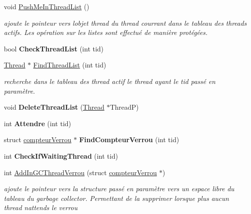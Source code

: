 \begin{DoxyCompactItemize}
void \hyperlink{class_addr_space_a0357219ec2eaccdd49b7635bf06f8172}{Push\+Me\+In\+Thread\+List} ()
\begin{DoxyCompactList}\small\item\em ajoute le pointeur vers l\textquotesingle{}objet thread du thread courrant dans le tableau des threads actifs. Les opération sur les listes sont effectué de manière protégées. \end{DoxyCompactList}\item 
\hypertarget{class_addr_space_a87a8af28618b37bd50316398d5114612}{}\label{class_addr_space_a87a8af28618b37bd50316398d5114612} 
bool {\bfseries Check\+Thread\+List} (int tid)
\item 
\hyperlink{class_thread}{Thread} $\ast$ \hyperlink{class_addr_space_aaaefe0a86296c40a15f6f238bf96f30e}{Find\+Thread\+List} (int tid)
\begin{DoxyCompactList}\small\item\em recherche dans le tableau des thread actif le thread ayant le tid passé en paramètre. \end{DoxyCompactList}\item 
\hypertarget{class_addr_space_a562bc7b549fe84fdc62c90f218bbc528}{}\label{class_addr_space_a562bc7b549fe84fdc62c90f218bbc528} 
void {\bfseries Delete\+Thread\+List} (\hyperlink{class_thread}{Thread} $\ast$ThreadP)
\item 
\hypertarget{class_addr_space_ab20a6e47ab579c7bd195118fdf7d62ca}{}\label{class_addr_space_ab20a6e47ab579c7bd195118fdf7d62ca} 
int {\bfseries Attendre} (int tid)
\item 
\hypertarget{class_addr_space_a1c9adc2f0c3d96a6e646fa9e3fd3ffbf}{}\label{class_addr_space_a1c9adc2f0c3d96a6e646fa9e3fd3ffbf} 
struct \hyperlink{structcompteur_verrou}{compteur\+Verrou} $\ast$ {\bfseries Find\+Compteur\+Verrou} (int tid)
\item 
\hypertarget{class_addr_space_ab3d5374f27f38e8411722dc73d39a22b}{}\label{class_addr_space_ab3d5374f27f38e8411722dc73d39a22b} 
int {\bfseries Check\+If\+Waiting\+Thread} (int tid)
\item 
int \hyperlink{class_addr_space_af63bb5a857c1403fa47b0a55ea989130}{Add\+In\+G\+C\+Thread\+Verrou} (struct \hyperlink{structcompteur_verrou}{compteur\+Verrou} $\ast$)
\begin{DoxyCompactList}\small\item\em ajoute le pointeur vers la structure passé en paramètre vers un espace libre du tableau du garbage collector. Permettant de la supprimer lorsque plus aucun thread n\textquotesingle{}attends le verrou \end{DoxyCompactList}\item 

\end{DoxyCompactItemize}
